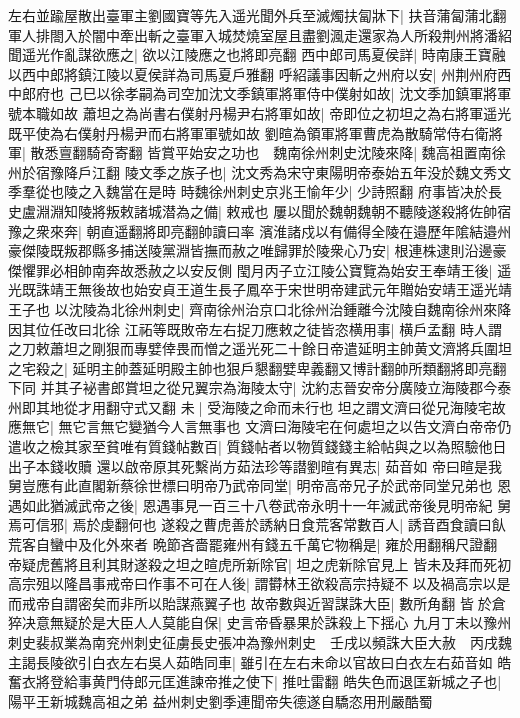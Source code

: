 左右並踰屋散出臺軍主劉國寶等先入遥光聞外兵至滅燭扶匐牀下|{
	扶音蒲匐蒲北翻}
軍人排閤入於闇中牽出斬之臺軍入城焚燒室屋且盡劉渢走還家為人所殺荆州將潘紹聞遥光作亂謀欲應之|{
	欲以江陵應之也將即亮翻}
西中郎司馬夏侯詳|{
	時南康王寶融以西中郎將鎮江陵以夏侯詳為司馬夏戶雅翻}
呼紹議事因斬之州府以安|{
	州荆州府西中郎府也}
己巳以徐孝嗣為司空加沈文季鎮軍將軍侍中僕射如故|{
	沈文季加鎮軍將軍號本職如故}
蕭坦之為尚書右僕射丹楊尹右將軍如故|{
	帝即位之初坦之為右將軍遥光既平使為右僕射丹楊尹而右將軍軍號如故}
劉暄為領軍將軍曹虎為散騎常侍右衛將軍|{
	散悉亶翻騎奇寄翻}
皆賞平始安之功也　魏南徐州刺史沈陵來降|{
	魏高祖置南徐州於宿豫降戶江翻}
陵文季之族子也|{
	沈文秀為宋守東陽明帝泰始五年没於魏文秀文季羣從也陵之入魏當在是時}
時魏徐州刺史京兆王愉年少|{
	少詩照翻}
府事皆决於長史盧淵淵知陵將叛敕諸城潜為之備|{
	敕戒也}
屢以聞於魏朝魏朝不聽陵遂殺將佐帥宿豫之衆來奔|{
	朝直遥翻將即亮翻帥讀曰率}
濱淮諸戍以有備得全陵在邉歷年隂結邉州豪傑陵既叛郡縣多捕送陵黨淵皆撫而赦之唯歸罪於陵衆心乃安|{
	根連株逮則沿邊豪傑懼罪必相帥南奔故悉赦之以安反側}
閠月丙子立江陵公寶覽為始安王奉靖王後|{
	遥光既誅靖王無後故也始安貞王道生長子鳳卒于宋世明帝建武元年贈始安靖王遥光靖王子也}
以沈陵為北徐州刺史|{
	齊南徐州治京口北徐州治鍾離今沈陵自魏南徐州來降因其位任改曰北徐}
江祏等既敗帝左右捉刀應敕之徒皆恣横用事|{
	横戶孟翻}
時人謂之刀敕蕭坦之剛狠而專嬖倖畏而憎之遥光死二十餘日帝遣延明主帥黄文濟將兵圍坦之宅殺之|{
	延明主帥蓋延明殿主帥也狠戶懇翻嬖卑義翻又博計翻帥所類翻將即亮翻下同}
并其子袐書郎賞坦之從兄翼宗為海陵太守|{
	沈約志晉安帝分廣陵立海陵郡今泰州即其地從才用翻守式又翻}
未|{
	受海陵之命而未行也}
坦之謂文濟曰從兄海陵宅故應無它|{
	無它言無它變猶今人言無事也}
文濟曰海陵宅在何處坦之以告文濟白帝帝仍遣收之檢其家至貧唯有質錢帖數百|{
	質錢帖者以物質錢錢主給帖與之以為照驗他日出子本錢收贖}
還以啟帝原其死繫尚方茹法珍等譛劉暄有異志|{
	茹音如}
帝曰暄是我舅豈應有此直閣新蔡徐世標曰明帝乃武帝同堂|{
	明帝高帝兄子於武帝同堂兄弟也}
恩遇如此猶滅武帝之後|{
	恩遇事見一百三十八卷武帝永明十一年滅武帝後見明帝紀}
舅焉可信邪|{
	焉於虔翻何也}
遂殺之曹虎善於誘納日食荒客常數百人|{
	誘音酉食讀曰飤荒客自蠻中及化外來者}
晩節吝嗇罷雍州有錢五千萬它物稱是|{
	雍於用翻稱尺證翻}
帝疑虎舊將且利其財遂殺之坦之暄虎所新除官|{
	坦之虎新除官見上}
皆未及拜而死初高宗殂以隆昌事戒帝曰作事不可在人後|{
	謂欎林王欲殺高宗持疑不以及禍高宗以是而戒帝自謂密矣而非所以貽謀燕翼子也}
故帝數與近習謀誅大臣|{
	數所角翻}
皆於倉猝决意無疑於是大臣人人莫能自保|{
	史言帝昏暴果於誅殺上下揺心}
九月丁未以豫州刺史裴叔業為南兖州刺史征虜長史張冲為豫州刺史　壬戌以頻誅大臣大赦　丙戌魏主謁長陵欲引白衣左右吳人茹皓同車|{
	雖引在左右未命以官故曰白衣左右茹音如}
皓奮衣將登給事黄門侍郎元匡進諫帝推之使下|{
	推吐雷翻}
皓失色而退匡新城之子也|{
	陽平王新城魏高祖之弟}
益州刺史劉季連聞帝失德遂自驕恣用刑嚴酷蜀


